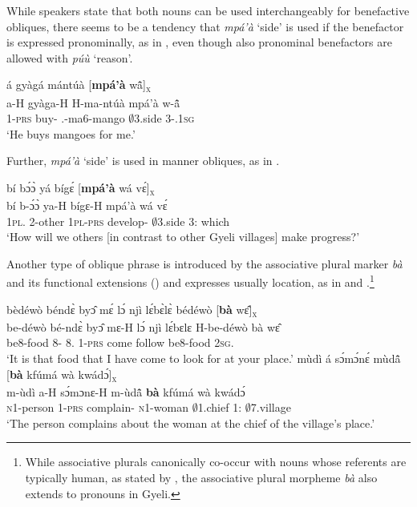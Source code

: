 While speakers state that both nouns can be used interchangeably for benefactive obliques, there seems to be a tendency that {\itshape mpá'à} `side' is used if the benefactor is expressed pronominally, as in , even though also pronominal benefactors are allowed with {\itshape púù} `reason'.

\ea \label{BEN4}
  \glll á gyàgá mántúà [{\bfseries mpá'à} wã̂]\textsubscript{\textsc{x}} \\
        a-H gyàga-H H-ma-ntúà {\db}mpá'à w-ã̂ \\
        1-\textsc{prs} buy-{\R} {\OBJ}.{\LINK}-ma6-mango {\db}$\emptyset$3.side 3-{\POSS}.1\textsc{sg} \\
    \trans `He buys mangoes for me.'
\z

\noindent Further, {\itshape mpá'à} `side' is used in manner obliques, as in .

\ea \label{MAN1}
  \glll   bí bɔ́ɔ̀ yá bígɛ́ [{\bfseries mpá'à} wá vɛ́]\textsubscript{\textsc{x}} \\
           bí b-ɔ́ɔ̀ ya-H bígɛ-H {\db}mpá'à wá vɛ́ \\
           1\textsc{pl}.{\SBJ} 2-other 1\textsc{pl}-\textsc{prs} develop-{\R} {\db}$\emptyset$3.side 3:{\ATT} which\\
    \trans `How will we others [in contrast to other Gyeli villages] make progress?'
\z



Another type of oblique phrase is introduced by the associative plural marker {\itshape bà} and its functional extensions () and expresses usually location, as in  and .\footnote{While associative plurals canonically co-occur with nouns whose referents are typically human, as stated by \citet{daniel2013}, the associative plural morpheme {\itshape bà} also extends to pronouns in Gyeli.}

\ea \label{chez1}
  \glll bèdéwò béndɛ̀ byɔ̂ mɛ́ lɔ́ njì lɛ́bɛ̀lɛ̀ bédéwò [{\bfseries bà} wɛ̂]\textsubscript{\textsc{x}} \\
        be-déwò bé-ndɛ̀ byɔ̂ mɛ-H lɔ́ njì lɛ́bɛlɛ H-be-déwò {\db}bà wɛ̂ \\
           be8-food 8-{\ANA} 8.{\OBJ} 1-\textsc{prs} {\RETRO} come  follow be8-food {\db}{\AP} 2\textsc{sg}.{\OBJ}  \\
    \trans `It is that food that I have come to look for at your place.'
\ex \label{chez2}
  \glll mùdì á sɔ́mɔ́nɛ́ mùdã̂ [{\bfseries bà} kfúmá wà kwádɔ́]\textsubscript{\textsc{x}} \\
        m-ùdì a-H sɔ́mɔnɛ-H m-ùdã̂ {\db}{\bfseries bà} kfúmá wà kwádɔ́ \\
           \textsc{n}1-person 1-\textsc{prs} complain-{\R} \textsc{n}1-woman {\db}{\AP} $\emptyset$1.chief 1:{\ATT} $\emptyset$7.village\\
    \trans `The person complains about the woman at the chief of the village's place.'
\z

